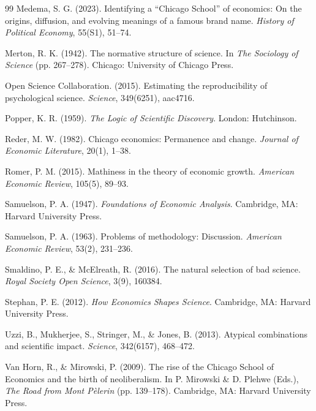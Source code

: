 \documentclass[12pt,a4paper]{article}
\begin{document}
\begin{thebibliography}{99}
Medema, S. G. (2023). Identifying a ``Chicago School'' of economics: On the origins, diffusion, and evolving meanings of a famous brand name. \textit{History of Political Economy}, 55(S1), 51--74.

Merton, R. K. (1942). The normative structure of science. In \textit{The Sociology of Science} (pp. 267--278). Chicago: University of Chicago Press.

Open Science Collaboration. (2015). Estimating the reproducibility of psychological science. \textit{Science}, 349(6251), aac4716.

Popper, K. R. (1959). \textit{The Logic of Scientific Discovery}. London: Hutchinson.

Reder, M. W. (1982). Chicago economics: Permanence and change. \textit{Journal of Economic Literature}, 20(1), 1--38.

Romer, P. M. (2015). Mathiness in the theory of economic growth. \textit{American Economic Review}, 105(5), 89--93.

Samuelson, P. A. (1947). \textit{Foundations of Economic Analysis}. Cambridge, MA: Harvard University Press.

Samuelson, P. A. (1963). Problems of methodology: Discussion. \textit{American Economic Review}, 53(2), 231--236.

Smaldino, P. E., \& McElreath, R. (2016). The natural selection of bad science. \textit{Royal Society Open Science}, 3(9), 160384.

Stephan, P. E. (2012). \textit{How Economics Shapes Science}. Cambridge, MA: Harvard University Press.

Uzzi, B., Mukherjee, S., Stringer, M., \& Jones, B. (2013). Atypical combinations and scientific impact. \textit{Science}, 342(6157), 468--472.

Van Horn, R., \& Mirowski, P. (2009). The rise of the Chicago School of Economics and the birth of neoliberalism. In P. Mirowski \& D. Plehwe (Eds.), \textit{The Road from Mont P\`{e}lerin} (pp. 139--178). Cambridge, MA: Harvard University Press.


\end{thebibliography}
\end{document}

